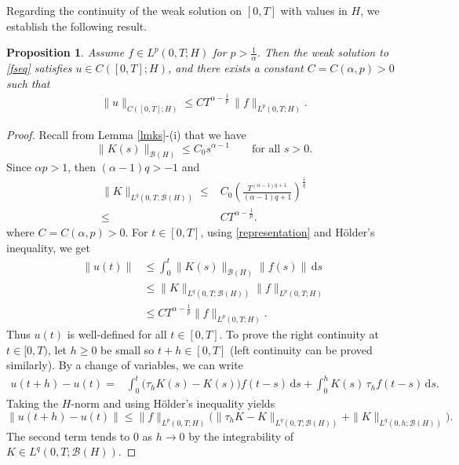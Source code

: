 \documentclass[reqno]{amsart}
\newtheorem{prop}[theorem]{Proposition}
\numberwithin{equation}{section}
\def \d {\mathrm{d}}
\begin{document}
Regarding the continuity of the weak solution on $[0,T]$ with values in $H$, we establish the following result.
\begin{prop}\label{propc}
Assume $f\in L^p(0,T;H)$ for $p>\frac{1}{\alpha}$. Then the weak solution to \eqref{fseq} satisfies $u\in C([0,T];H)$, and there exists a constant $C=C(\alpha,p) >0$ such that
\begin{align}
    \|u\|_{C([0,T];H)}\le CT^{\alpha-\frac{1}{p}}\,\|f\|_{L^p(0,T;H)}. \label{energy:conti}
\end{align}
\end{prop}
\begin{proof}
Recall from Lemma \ref{lmks}-(i) that we have
\[\|K(s)\|_{\mathcal{B}(H)}\leq C_{0}s^{\alpha-1} \qquad \text{for all } s>0.\]
Since $\alpha p> 1$, then $(\alpha-1)q>-1$ and 
\begin{align*}
    \|K\|_{L^{q}(0,T;\mathcal{B}(H))}\leq& C_{0}\left(\frac{T^{(\alpha-1)q+1}}{(\alpha-1)q+1}\right)^{\frac{1}{q}}\\
    \leq & CT^{\alpha-\frac{1}{p}}.
\end{align*}
where $C=C(\alpha,p)>0$.
For \(t\in[0,T]\), using \eqref{representation} and Hölder's inequality, we get
\begin{align}
	\|u(t)\| &\le  \int_0^t \|K(s)\|_{\mathcal{B}(H)}\|f(s)\|\,\d s \nonumber\\
	&\le \|K\|_{L^{q}(0,T;\mathcal{B}(H))} \|f\|_{L^{p}(0,T;H)} \nonumber\\
	&\le CT^{\alpha-\frac{1}{p}}\|f\|_{L^{p}(0,T;H)}. \label{est:conti}
\end{align}
Thus \(u(t)\) is well-defined for all \(t\in[0,T]\).
	To prove the right continuity at \(t\in [0,T)\), let \(h\geq 0\) be small so \(t+h\in[0,T]\) (left continuity can be proved similarly). By a change of variables, we can write
	\begin{align*}
		u(t+h)-u(t)
		=& \int_0^{t} \big(\tau_hK(s)-K(s)\big) f(t-s)\,\d s
		+ \int_{0}^{h} K(s)\,\tau_hf(t-s)\,\d s.
	\end{align*}
	Taking the \(H\)-norm and using Hölder's inequality yields
	\[
	\|u(t+h)-u(t)\|
	\le \|f\|_{L^p(0,T;H)} \Big( \|\tau_h K-K\|_{L^q(0,T;\mathcal{B}(H))}
	+ \|K\|_{L^q(0,h;\mathcal{B}(H))}\Big).
	\]
	The second term tends to \(0\) as \(h\to0\) by the integrability of $K\in L^q(0,T;\mathcal{B}(H))$.
    

\end{proof}
\end{document}
